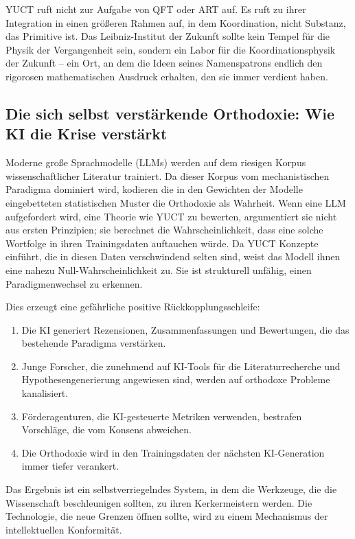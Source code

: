 \documentclass[12pt,a4paper]{article}
\begin{document}
	YUCT ruft nicht zur Aufgabe von QFT oder ART auf. Es ruft zu ihrer Integration in einen größeren Rahmen auf, in dem Koordination, nicht Substanz, das Primitive ist. Das Leibniz-Institut der Zukunft sollte kein Tempel für die Physik der Vergangenheit sein, sondern ein Labor für die Koordinationsphysik der Zukunft – ein Ort, an dem die Ideen seines Namenspatrons endlich den rigorosen mathematischen Ausdruck erhalten, den sie immer verdient haben.
	
	\subsection{Die sich selbst verstärkende Orthodoxie: Wie KI die Krise verstärkt}
	
	Moderne große Sprachmodelle (LLMs) werden auf dem riesigen Korpus wissenschaftlicher Literatur trainiert. Da dieser Korpus vom mechanistischen Paradigma dominiert wird, kodieren die in den Gewichten der Modelle eingebetteten statistischen Muster die Orthodoxie als Wahrheit. Wenn eine LLM aufgefordert wird, eine Theorie wie YUCT zu bewerten, argumentiert sie nicht aus ersten Prinzipien; sie berechnet die Wahrscheinlichkeit, dass eine solche Wortfolge in ihren Trainingsdaten auftauchen würde. Da YUCT Konzepte einführt, die in diesen Daten verschwindend selten sind, weist das Modell ihnen eine nahezu Null-Wahrscheinlichkeit zu. Sie ist strukturell unfähig, einen Paradigmenwechsel zu erkennen.
	
	Dies erzeugt eine gefährliche positive Rückkopplungsschleife:
	\begin{enumerate}
		\item Die KI generiert Rezensionen, Zusammenfassungen und Bewertungen, die das bestehende Paradigma verstärken.
		\item Junge Forscher, die zunehmend auf KI-Tools für die Literaturrecherche und Hypothesengenerierung angewiesen sind, werden auf orthodoxe Probleme kanalisiert.
		\item Förderagenturen, die KI-gesteuerte Metriken verwenden, bestrafen Vorschläge, die vom Konsens abweichen.
		\item Die Orthodoxie wird in den Trainingsdaten der nächsten KI-Generation immer tiefer verankert.
	\end{enumerate}
	Das Ergebnis ist ein selbstverriegelndes System, in dem die Werkzeuge, die die Wissenschaft beschleunigen sollten, zu ihren Kerkermeistern werden. Die Technologie, die neue Grenzen öffnen sollte, wird zu einem Mechanismus der intellektuellen Konformität.
	
\end{document}
